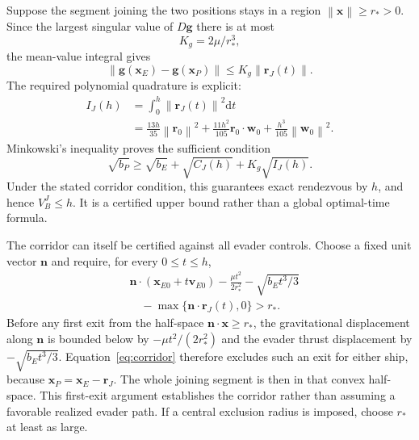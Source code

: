 \documentclass[journal,a4paper]{IEEEtran}
\newcommand{\norm}[1]{\left\|#1\right\|}
\newcommand{\dd}{\mathrm d}
\begin{document}
Suppose the segment joining the two positions stays in a region $\norm{\mathbf x}\ge r_*>0$. Since the largest singular value of $D\mathbf g$ there is at most
\begin{equation}
 K_g=2\mu/r_*^3,
\end{equation}
the mean-value integral gives
\begin{equation}
 \norm{\mathbf g(\mathbf x_E)-\mathbf g(\mathbf x_P)}
       \le K_g\norm{\mathbf r_J(t)}.
\end{equation}
The required polynomial quadrature is explicit:
\begin{align}
 I_J(h)&=\int_0^h\norm{\mathbf r_J(t)}^2\dd t\nonumber\\
 &=\frac{13h}{35}\norm{\mathbf r_0}^2
  +\frac{11h^2}{105}\mathbf r_0\cdot\mathbf w_0
  +\frac{h^3}{105}\norm{\mathbf w_0}^2.
 \label{eq:Jtidalquad}
\end{align}
Minkowski's inequality proves the sufficient condition
\begin{equation}
 \boxed{\sqrt{b_P}\ge\sqrt{b_E}+\sqrt{C_J(h)}+K_g\sqrt{I_J(h)}.}
 \label{eq:Jkeplerbound}
\end{equation}
Under the stated corridor condition, this guarantees exact rendezvous by $h$, and hence $V_B^J\le h$. It is a certified upper bound rather than a global optimal-time formula.

The corridor can itself be certified against all evader controls. Choose a fixed unit vector $\mathbf n$ and require, for every $0\le t\le h$,
\begin{equation}
\begin{split}
 &\mathbf n\cdot(\mathbf x_{E0}+t\mathbf v_{E0})
 -\frac{\mu t^2}{2r_*^2}-\sqrt{b_Et^3/3}\\
 &\hspace{1em}-\max\{\mathbf n\cdot\mathbf r_J(t),0\}>r_*.
\end{split}
 \label{eq:corridor}
\end{equation}
Before any first exit from the half-space $\mathbf n\cdot\mathbf x\ge r_*$, the gravitational displacement along $\mathbf n$ is bounded below by $-\mu t^2/(2r_*^2)$ and the evader thrust displacement by $-\sqrt{b_Et^3/3}$. Equation~\eqref{eq:corridor} therefore excludes such an exit for either ship, because $\mathbf x_P=\mathbf x_E-\mathbf r_J$. The whole joining segment is then in that convex half-space. This first-exit argument establishes the corridor rather than assuming a favorable realized evader path. If a central exclusion radius is imposed, choose $r_*$ at least as large.
\end{document}
